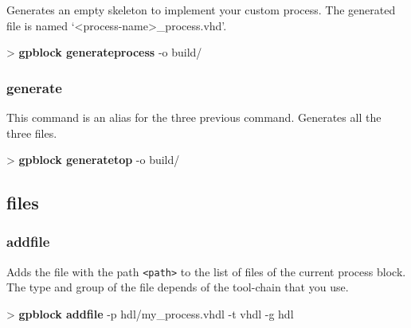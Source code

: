 \documentclass[10pt,a4paper]{article}
\begin{document}
Generates an empty skeleton to implement your custom process. The generated file is named `<process-name>\_process.vhd'.


\begin{sampletitle}
> \textbf{gpblock generateprocess} -o build/
\end{sampletitle}

\subsubsection{generate}

This command is an alias for the three previous command. Generates all the three files.


\begin{sampletitle}
> \textbf{gpblock generatetop} -o build/
\end{sampletitle}


\subsection{files}
\subsubsection{addfile}

Adds the file with the path \texttt{<path>} to the list of files of the current process block. The type and group of the file depends of the tool-chain that you use.


\begin{sampletitle}
> \textbf{gpblock addfile} -p hdl/my\_process.vhdl -t vhdl -g hdl
\end{sampletitle}
\end{document}
